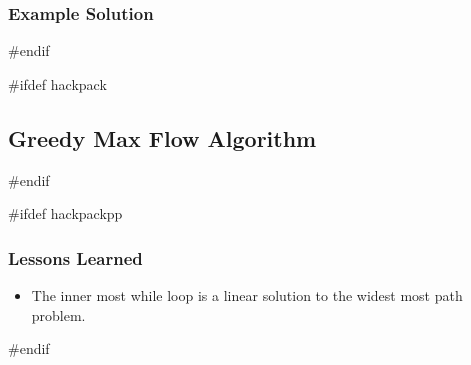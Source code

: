 \subsubsection{Example Solution}
#endif

#ifdef hackpack
\subsection{Greedy Max Flow Algorithm}
#endif

#ifdef hackpackpp
\subsubsection{Lessons Learned}
\begin{itemize}
	\item The inner most while loop is a linear solution to the widest most path problem.
\end{itemize}
#endif


